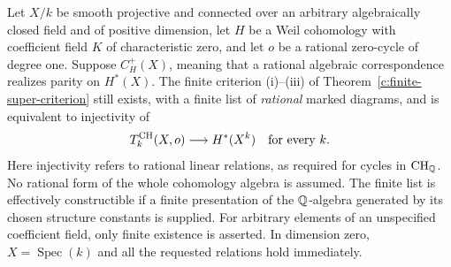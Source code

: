 \begin{corollary}
\label{c:finite-weil-criterion}
Let $X/k$ be smooth projective and connected over an arbitrary
algebraically closed field and of positive dimension, let $H$ be a
Weil cohomology with coefficient field $K$ of characteristic zero,
and let $o$ be a
rational zero-cycle of degree one.  Suppose $C^+_H(X)$, meaning
that a rational algebraic correspondence realizes parity on
$H^*(X)$.  The finite criterion (i)--(iii) of
Theorem~\ref{c:finite-super-criterion} still exists, with a finite
list of \emph{rational} marked diagrams, and is equivalent to
injectivity of
\[
 T_k^{\operatorname{CH}}(X,o)\longrightarrow H^*(X^k)
 \quad\hbox{for every }k.
\]
Here injectivity refers to rational linear relations, as required
for cycles in $\operatorname{CH}_\mathbb Q$.  No rational form of the whole cohomology
algebra is assumed.  The finite list is effectively constructible
if a finite presentation of the $\mathbb Q$-algebra generated by its
chosen structure constants is supplied.  For arbitrary elements
of an unspecified coefficient field, only finite existence is
asserted.  In dimension zero, $X=\operatorname{Spec}(k)$ and
all the requested relations hold immediately.
\end{corollary}

